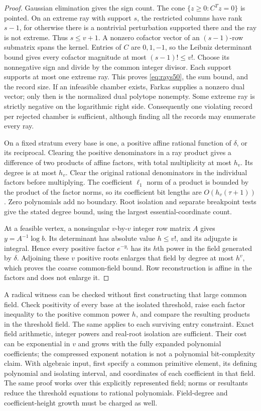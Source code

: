 \begin{proof}
Gaussian elimination gives the sign count. The cone
$\{z\ge0:C^Tz=0\}$ is pointed. On an extreme ray with support $s$, the
restricted columns have rank $s-1$, for otherwise there is a
nontrivial perturbation supported there and the ray is not extreme.
Thus $s\le v+1$. A nonzero cofactor vector of an $(s-1)$-row
submatrix spans the kernel. Entries of $C$ are $0,1,-1$, so the
Leibniz determinant bound gives every cofactor magnitude at most
$(s-1)!\le v!$. Choose its nonnegative sign and divide by the common
integer divisor. Each support supports at most one extreme ray.
This proves \eqref{eq:rays50}, the sum bound, and the record size.
If an infeasible chamber exists, Farkas supplies a nonzero dual
vector; only then is the normalized dual polytope nonempty. Some
extreme ray is strictly negative on the logarithmic right side.
Consequently one violating record per rejected chamber is sufficient,
although finding all the records may enumerate every ray.

On a fixed stratum every base is one, a positive affine rational
function of $\delta$, or its reciprocal. Clearing the positive
denominators in a ray product gives a difference of two products
of affine factors, with total multiplicity at most $h_v$. Its degree
is at most $h_v$. Clear the original rational denominators in the
individual factors before multiplying. The coefficient $\ell_1$ norm
of a product is bounded by the product of the factor norms, so its
coefficient bit lengths are $O(h_v(\tau+1))$. Zero polynomials add no
boundary. Root isolation and separate breakpoint tests give the
stated degree bound, using the largest essential-coordinate count.

At a feasible vertex, a nonsingular $v$-by-$v$ integer row matrix
$A$ gives $y=A^{-1}\log b$. Its determinant has absolute value
$h\le v!$, and its adjugate is integral. Hence every positive factor
$e^{-y_i}$ has its $h$th power in the field generated by $\delta$.
Adjoining these $v$ positive roots enlarges that field by degree at
most $h^v$, which proves the coarse common-field bound. Row
reconstruction is affine in the factors and does not enlarge it.
\end{proof}

A radical witness can be checked without first constructing that large
common field. Check positivity of every base at the isolated threshold,
raise each factor inequality to the positive common power $h$, and
compare the resulting products in the threshold field. The same applies
to each surviving entry constraint. Exact field arithmetic, integer
powers and real-root isolation are sufficient. Their cost can be
exponential in $v$ and grows with the fully expanded polynomial
coefficients; the compressed exponent notation is not a polynomial
bit-complexity claim. With algebraic input, first specify a common
primitive element, its defining polynomial and isolating interval,
and coordinates of each coefficient in that field. The same proof
works over this explicitly represented field; norms or resultants
reduce the threshold equations to rational polynomials. Field-degree
and coefficient-height growth must be charged as well.

